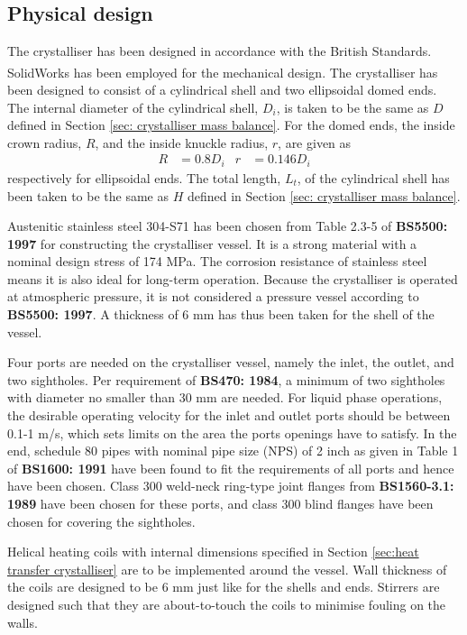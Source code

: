 \subsection{Physical design} \label{sec:physical design crystalliser}

The crystalliser has been designed in accordance with the British Standards.  SolidWorks\textsuperscript{\textregistered} has been employed for the mechanical design. The crystalliser has been designed to consist of a cylindrical shell and two ellipsoidal domed ends. The internal diameter of the cylindrical shell, $D_i$, is taken to be the same as $D$ defined in Section \ref{sec: crystalliser mass balance}. For the domed ends, the inside crown radius, $R$, and the inside knuckle radius, $r$, are given as 
\begin{align}
    R &= 0.8 D_i &
    r &= 0.146 D_i
\end{align}
respectively for ellipsoidal ends. The total length, $L_t$, of the cylindrical shell has been taken to be the same as $H$ defined in Section \ref{sec: crystalliser mass balance}. 

Austenitic stainless steel 304-S71 has been chosen from Table 2.3-5 of \textbf{BS5500: 1997} for constructing the crystalliser vessel. It is a strong material with a nominal design stress of 174 MPa. The corrosion resistance of stainless steel means it is also ideal for long-term operation. Because the crystalliser is operated at atmospheric pressure, it is not considered a pressure vessel according to \textbf{BS5500: 1997}. A thickness of 6 mm has thus been taken for the shell of the vessel.

Four ports are needed on the crystalliser vessel, namely the inlet, the outlet, and two sightholes. Per requirement of \textbf{BS470: 1984}, a minimum of two sightholes with diameter no smaller than 30 mm are needed. For liquid phase operations, the desirable operating velocity for the inlet and outlet ports should be between 0.1-1 m/s, which sets limits on the area the ports openings have to satisfy. In the end, schedule 80 pipes with nominal pipe size (NPS) of 2 inch as given in Table 1 of \textbf{BS1600: 1991} have been found to fit the requirements of all ports and hence have been chosen. Class 300 weld-neck ring-type joint flanges from \textbf{BS1560-3.1: 1989} have been chosen for these ports, and class 300 blind flanges have been chosen for covering the sightholes. 

Helical heating coils with internal dimensions specified in Section \ref{sec:heat transfer crystalliser} are to be implemented around the vessel. Wall thickness of the coils are designed to be 6 mm just like for the shells and ends. Stirrers are designed such that they are about-to-touch the coils to minimise fouling on the walls. 

